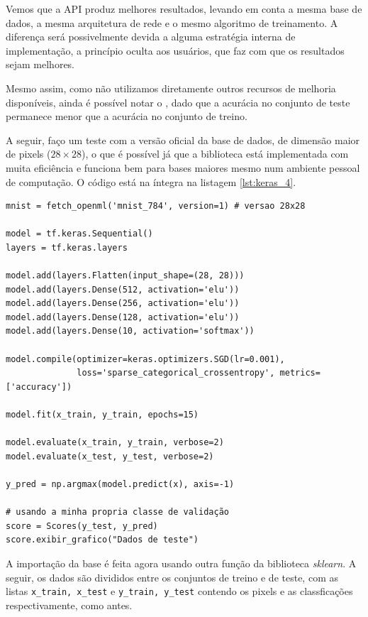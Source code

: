Vemos que a API produz melhores resultados, levando em conta a mesma base de dados, a mesma arquitetura de rede e o mesmo algoritmo de treinamento. A diferença será possivelmente devida a alguma estratégia interna de implementação, a princípio oculta aos usuários, que faz com que os resultados sejam melhores. 

Mesmo assim, como não utilizamos diretamente outros recursos de melhoria disponíveis, ainda é possível notar o , dado que a acurácia no conjunto de teste permanece menor que a acurácia no conjunto de treino. 

A seguir, faço um teste com a versão oficial da base de dados, de dimensão maior de pixels (${28\times28}$), o que é possível já que a biblioteca está implementada com muita eficiência e funciona bem para bases maiores mesmo num ambiente pessoal de computação. O código está na íntegra na listagem \ref{lst:keras_4}.
\newpage

\begin{scriptsize}
\estiloR
\begin{lstlisting}[caption={Trecho do script \eng{mnist\_keras.py}},label={lst:keras_4},escapeinside={\%}]
mnist = fetch_openml('mnist_784', version=1) # versao 28x28

model = tf.keras.Sequential()
layers = tf.keras.layers

model.add(layers.Flatten(input_shape=(28, 28)))
model.add(layers.Dense(512, activation='elu'))
model.add(layers.Dense(256, activation='elu'))
model.add(layers.Dense(128, activation='elu'))
model.add(layers.Dense(10, activation='softmax'))

model.compile(optimizer=keras.optimizers.SGD(lr=0.001),
              loss='sparse_categorical_crossentropy', metrics=['accuracy'])

model.fit(x_train, y_train, epochs=15)

model.evaluate(x_train, y_train, verbose=2)
model.evaluate(x_test, y_test, verbose=2)

y_pred = np.argmax(model.predict(x), axis=-1)

# usando a minha propria classe de validação
score = Scores(y_test, y_pred)
score.exibir_grafico("Dados de teste")
\end{lstlisting}
\end{scriptsize}

A importação da base é feita agora usando outra função da biblioteca \emph{sklearn}. A seguir, os dados são divididos entre os conjuntos de treino e de teste, com as listas \texttt{x\_train, x\_test} e \texttt{y\_train, y\_test} contendo os pixels e as classficações respectivamente, como antes.


